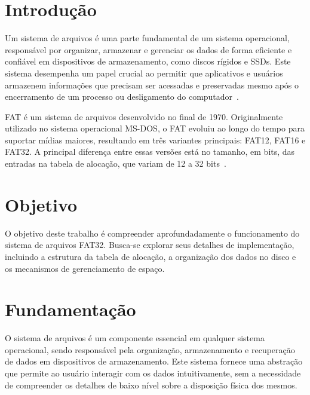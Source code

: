 \documentclass[
    12pt,				%
    oneside,   	        %
    a4paper,			%
    english,			%
    french,				%
    spanish,			%
    brazil,				%
    ]{pacotes/abntex2}
\begin{document}
\textual

\makeatletter
\renewcommand{\chapter}{\@gobbletwo}
\makeatother

\section{Introdução}
\label{sec:introducao}

Um sistema de arquivos é uma parte fundamental de um sistema operacional, responsável por organizar, armazenar e gerenciar os dados de forma eficiente e confiável em dispositivos de armazenamento, como discos rígidos e SSDs. Este sistema  desempenha um papel crucial ao permitir que aplicativos e usuários armazenem informações que precisam ser acessadas e preservadas mesmo após o encerramento de um processo ou desligamento do computador~\cite{tanenbaum2016}.

FAT é um sistema de arquivos desenvolvido no final de 1970. Originalmente utilizado no sistema operacional MS-DOS, o FAT evoluiu ao longo do tempo para suportar mídias maiores, resultando em três variantes principais: FAT12, FAT16 e FAT32. A principal diferença entre essas versões está no tamanho, em bits, das entradas na tabela de alocação, que variam de 12 a 32 bits~\cite{microsoft2000}.

\section{Objetivo}
\label{sec:objetivos}

O objetivo deste trabalho é compreender aprofundadamente o funcionamento do sistema de arquivos FAT32. Busca-se explorar seus detalhes de implementação, incluindo a estrutura da tabela de alocação, a organização dos dados no disco e os mecanismos de gerenciamento de espaço.

\section{Fundamentação}
\label{sec:fundamentacao}

O sistema de arquivos é um componente essencial em qualquer sistema operacional, sendo responsável pela organização, armazenamento e recuperação de dados em dispositivos de armazenamento. Este sistema fornece uma abstração que permite ao usuário interagir com os dados intuitivamente, sem a necessidade de compreender os detalhes de baixo nível sobre a disposição física dos mesmos.
\end{document}
